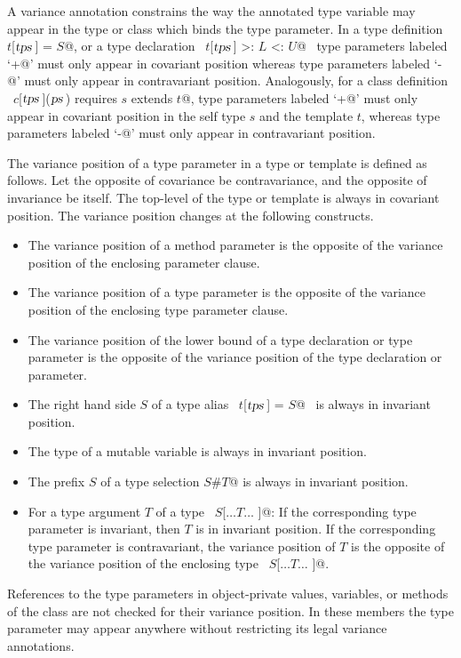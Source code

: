 A variance annotation constrains the way the annotated type variable
may appear in the type or class which binds the type parameter.  In a
type definition ~\lstinline@type $t$[$\mbox{\sl tps}\,$] = $S$@, or a type declaration ~\lstinline@type $t$[$\mbox{\sl tps}\,$] >: $L$ <: $U$@~ type parameters labeled
`\lstinline@+@' must only appear in covariant position whereas
type parameters labeled `\lstinline@-@' must only appear in contravariant
position. Analogously, for a class definition
~\lstinline@class $c$[$\mbox{\sl tps}\,$]($\mbox{\sl ps}\,$) requires $s$ extends $t$@, type parameters labeled
`\lstinline@+@' must only appear in covariant position in the self type
$s$ and the template $t$, whereas type
parameters labeled `\lstinline@-@' must only appear in contravariant
position. 

The variance position of a type parameter in a type or template is
defined as follows.  Let the opposite of covariance be contravariance,
and the opposite of invariance be itself.  The top-level of the type
or template is always in covariant position. The variance position
changes at the following constructs.
\begin{itemize}
\item
The variance position of a method parameter is the opposite of the 
variance position of the enclosing parameter clause.
\item
The variance position of a type parameter is the opposite of the
variance position of the enclosing type parameter clause.
\item
The variance position of the lower bound of a type declaration or type parameter 
is the opposite of the variance position of the type declaration or parameter.  
\item
The right hand side $S$ of a type alias ~\lstinline@type $t$[$\mbox{\sl tps}\,$] = $S$@~ 
is always in invariant position.
\item
The type of a mutable variable is always in invariant position.
\item 
The prefix $S$ of a type selection \lstinline@$S$#$T$@ is always in invariant position.
\item
For a type argument $T$ of a type ~\lstinline@$S$[$\ldots T \ldots$ ]@: If the
corresponding type parameter is invariant, then $T$ is in
invariant position.  If the corresponding type parameter is
contravariant, the variance position of $T$ is the opposite of
the variance position of the enclosing type ~\lstinline@$S$[$\ldots T \ldots$ ]@.
\end{itemize}
References to the type parameters in object-private values, variables,
or methods of the class are not checked for their variance
position. In these members the type parameter may appear anywhere
without restricting its legal variance annotations.

